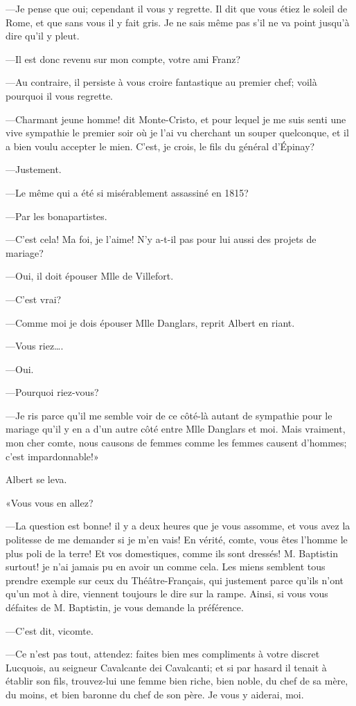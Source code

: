 —Je pense que oui; cependant il vous y regrette. Il dit que vous étiez le soleil de Rome, et que sans vous il y fait gris. Je ne sais même pas s'il ne va point jusqu'à dire qu'il y pleut. 

—Il est donc revenu sur mon compte, votre ami Franz? 

—Au contraire, il persiste à vous croire fantastique au premier chef; voilà pourquoi il vous regrette. 

—Charmant jeune homme! dit Monte-Cristo, et pour lequel je me suis senti une vive sympathie le premier soir où je l'ai vu cherchant un souper quelconque, et il a bien voulu accepter le mien. C'est, je crois, le fils du général d'Épinay? 

—Justement. 

—Le même qui a été si misérablement assassiné en 1815? 

—Par les bonapartistes. 

—C'est cela! Ma foi, je l'aime! N'y a-t-il pas pour lui aussi des projets de mariage? 

—Oui, il doit épouser Mlle de Villefort. 

—C'est vrai? 

—Comme moi je dois épouser Mlle Danglars, reprit Albert en riant. 

—Vous riez\dots. 

—Oui. 

—Pourquoi riez-vous? 

—Je ris parce qu'il me semble voir de ce côté-là autant de sympathie pour le mariage qu'il y en a d'un autre côté entre Mlle Danglars et moi. Mais vraiment, mon cher comte, nous causons de femmes comme les femmes causent d'hommes; c'est impardonnable!» 

Albert se leva. 

«Vous vous en allez? 

—La question est bonne! il y a deux heures que je vous assomme, et vous avez la politesse de me demander si je m'en vais! En vérité, comte, vous êtes l'homme le plus poli de la terre! Et vos domestiques, comme ils sont dressés! M. Baptistin surtout! je n'ai jamais pu en avoir un comme cela. Les miens semblent tous prendre exemple sur ceux du Théâtre-Français, qui justement parce qu'ils n'ont qu'un mot à dire, viennent toujours le dire sur la rampe. Ainsi, si vous vous défaites de M. Baptistin, je vous demande la préférence. 

—C'est dit, vicomte. 

—Ce n'est pas tout, attendez: faites bien mes compliments à votre discret Lucquois, au seigneur Cavalcante dei Cavalcanti; et si par hasard il tenait à établir son fils, trouvez-lui une femme bien riche, bien noble, du chef de sa mère, du moins, et bien baronne du chef de son père. Je vous y aiderai, moi. 

